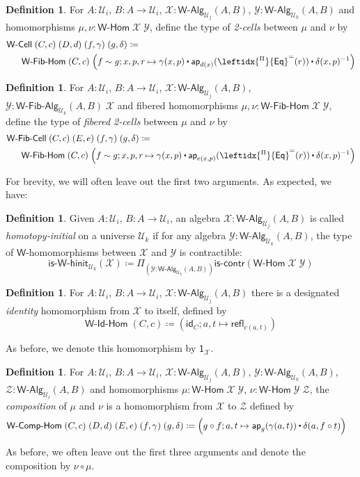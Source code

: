 \documentclass[11pt]{article}
\newcommand{\X}{\mathcal{X}}
\newcommand{\Y}{\mathcal{Y}}
\newcommand{\Z}{\mathcal{Z}}
\newcommand{\comp}{\circ}
\newcommand{\idfun}[1]{\mathsf{id}_{#1}}
\newcommand{\prd}[1]{\Pi_{#1}}
\newcommand{\defeq}{\coloneqq}
\newcommand{\refl}{\mathsf{refl}}
\newcommand{\W}{\mathsf{W}}
\newcommand{\funext}{\leftidx{^\Pi}{\mathsf{Eq}}^{=}}
\newcommand{\one}{\mathsf{1}}
\newcommand{\UU}{\mathcal{U}}
\newcommand{\WCell}{\mathsf{W}\text{-}\mathsf{Cell}}
\newcommand{\WFibCell}{\mathsf{W}\text{-}\mathsf{Fib}\text{-}\mathsf{Cell}}
\newcommand{\WAlg}{\mathsf{W}\text{-}\mathsf{Alg}}
\newcommand{\WFibAlg}{\mathsf{W}\text{-}\mathsf{Fib}\text{-}\mathsf{Alg}}
\newcommand{\WHom}{\mathsf{W}\text{-}\mathsf{Hom}}
\newcommand{\WFibHom}{\mathsf{W}\text{-}\mathsf{Fib}\text{-}\mathsf{Hom}}
\newcommand{\IsWHInit}{\mathsf{is}\text{-}\mathsf{\W}\text{-}\mathsf{hinit}}
\newcommand{\app}{\mathsf{ap}}
\newcommand{\iscontr}{\mathsf{is}\text{-}\mathsf{contr}}
\newcommand{\WIdHom}{\mathsf{W}\text{-}\mathsf{Id}\text{-}\mathsf{Hom}}
\newcommand{\WCompHom}{\mathsf{W}\text{-}\mathsf{Comp}\text{-}\mathsf{Hom}}
\newcommand{\ct}{%
  \mathchoice{\mathbin{\raisebox{0.5ex}{$\displaystyle\centerdot$}}}%
             {\mathbin{\raisebox{0.5ex}{$\centerdot$}}}%
             {\mathbin{\raisebox{0.25ex}{$\scriptstyle\,\centerdot\,$}}}%
             {\mathbin{\raisebox{0.1ex}{$\scriptscriptstyle\,\centerdot\,$}}}}
\theoremstyle{definition}
\newtheorem{definition}[theorem]{Definition}
\begin{document}
\begin{definition}\label{def:WCell}
For $A:\UU_i$, $B : A \to \UU_i$, $\X : \WAlg_{\UU_j}(A,B)$, $\Y : \WAlg_{\UU_k}(A,B)$ and homomorphisms $\mu, \nu : \WHom \; \X \; \Y$, define the type of \emph{2-cells} between $\mu$ and $\nu$ by
\begin{align*} & \WCell \; (C,c) \; (D,d) \; (f,\gamma) \; (g,\delta) \defeq \\ & \;\;\; \;\;\;\WFibHom \; (C,c) \; \Big(f \sim g; x,p,r \mapsto \gamma(x,p) \ct \app_{d(x)}(\funext(r)) \ct \delta(x,p)^{-1}\Big)
\end{align*}
\end{definition}

\begin{definition}\label{def:WFibCell}
For $A:\UU_i$, $B : A \to \UU_i$, $\X : \WAlg_{\UU_j}(A,B)$, $\Y : \WFibAlg_{\UU_k}(A,B) \; \X$ and fibered homomorphisms $\mu, \nu : \WFibHom \; \X \; \Y$, define the type of \emph{fibered 2-cells} between $\mu$ and $\nu$ by
\begin{align*} & \WFibCell \; (C,c) \; (E, e) \; (f,\gamma) \; (g,\delta) \defeq \\ & \;\;\; \;\;\;\WFibHom \; (C,c) \; \Big(f \sim g; x,p,r \mapsto \gamma(x,p) \ct \app_{e(x,p)}(\funext(r)) \ct \delta(x,p)^{-1}\Big)
\end{align*}
\end{definition}
For brevity, we will often leave out the first two arguments. As expected, we have:
\begin{definition}\label{def:WHInit}
Given $A:\UU_i$, $B : A \to \UU_i$, an algebra $\X : \WAlg_{\UU_j}(A,B)$ is called \emph{homotopy-initial} on a universe $\UU_k$ if for any algebra $\Y : \WAlg_{\UU_k}(A,B)$, the type of $\W$-homomorphisms between $\X$ and $\Y$ is contractible:
\[ \IsWHInit_{\UU_k}(\X) \defeq \prd{(\Y:\WAlg_{\UU_k}(A,B))} \iscontr(\WHom \; \X \; \Y) \]  
\end{definition}

\begin{definition}
For $A:\UU_i$, $B : A \to \UU_i$, $\X : \WAlg_{\UU_j}(A,B)$ there is a designated \emph{identity} homomorphism from $\X$ to itself, defined by
\[ \WIdHom \; (C,c) \defeq (\idfun{C}; a,t \mapsto \refl_{c(a,t)}) \]
\end{definition}
As before, we denote this homomorphism by $\one_\X$.

\begin{definition}
For $A:\UU_i$, $B : A \to \UU_i$, $\X : \WAlg_{\UU_j}(A,B)$, $\Y : \WAlg_{\UU_k}(A,B)$, $\Z : \WAlg_{\UU_l}(A,B)$ and homomorphisms $\mu : \WHom \; \X \; \Y$, $\nu : \WHom \; \Y \; \Z$, the \emph{composition} of $\mu$ and $\nu$ is a homomorphism from $\X$ to $\Z$ defined by
\begin{align*} & \WCompHom \; (C,c) \; (D,d) \; (E,e) \; (f,\gamma) \; (g,\delta) \defeq  \Big(g \comp f; a,t \mapsto \app_g(\gamma(a,t)) \ct \delta(a, f \comp t) \Big)
\end{align*}
\end{definition}
As before, we often leave out the first three arguments and denote the composition by $\nu \comp \mu$.
\end{document}

